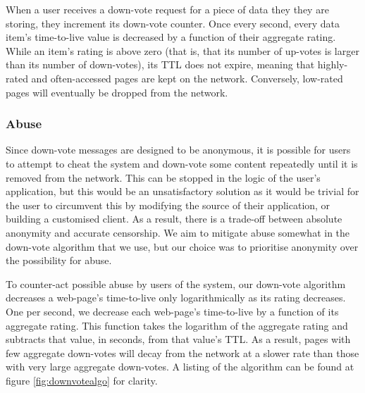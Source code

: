 When a user receives a down-vote request for a piece of data they they are storing, they increment its down-vote counter.
Once every second, every data item's time-to-live value is decreased by a function of their aggregate rating.
While an item's rating is above zero (that is, that its number of up-votes is larger than its number of down-votes),
its TTL does not expire, meaning that highly-rated and often-accessed pages are kept on the network.
Conversely, low-rated pages will eventually be dropped from the network.

\subsubsection{Abuse}

Since down-vote messages are designed to be anonymous, it is possible for users to attempt to cheat the system and
down-vote some content repeatedly until it is removed from the network. This can be stopped in the logic of the
user's application, but this would be an unsatisfactory solution as it would be trivial for the user to circumvent this by
modifying the source of their application, or building a customised client. As a result, there is a trade-off between absolute
anonymity and accurate censorship. We aim to mitigate abuse somewhat in the down-vote algorithm that we use, but our choice was 
to prioritise anonymity over the possibility for abuse.

To counter-act possible abuse by users of the system, our down-vote algorithm decreases a web-page's time-to-live only 
logarithmically as its rating decreases. One per second, we decrease each web-page's time-to-live by a function of its
aggregate rating. This function takes the logarithm of the aggregate rating and subtracts that value, in seconds,
from that value's TTL. As a result, pages with few aggregate down-votes will decay from the network at a slower rate than
those with very large aggregate down-votes. A listing of the algorithm can be found at figure \ref{fig:downvotealgo} for clarity.

